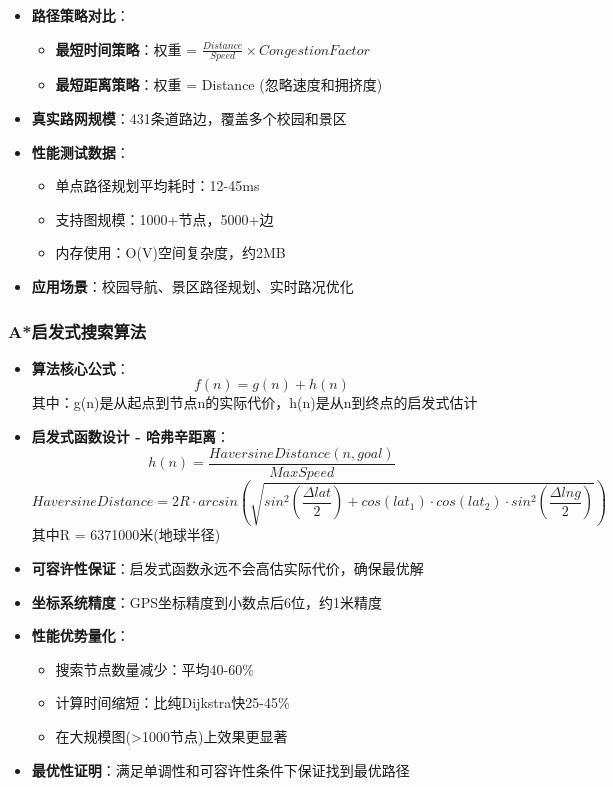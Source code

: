 \documentclass[12pt,a4paper]{article}
\begin{document}
\begin{itemize}
    \item \textbf{路径策略对比}：
    \begin{itemize}
        \item \textbf{最短时间策略}：权重 = \(\frac{Distance}{Speed} \times CongestionFactor\)
        \item \textbf{最短距离策略}：权重 = Distance (忽略速度和拥挤度)
    \end{itemize}
    \item \textbf{真实路网规模}：431条道路边，覆盖多个校园和景区
    \item \textbf{性能测试数据}：
    \begin{itemize}
        \item 单点路径规划平均耗时：12-45ms
        \item 支持图规模：1000+节点，5000+边
        \item 内存使用：O(V)空间复杂度，约2MB
    \end{itemize}
    \item \textbf{应用场景}：校园导航、景区路径规划、实时路况优化
\end{itemize}

\subsubsection{A*启发式搜索算法}
\begin{itemize}
    \item \textbf{算法核心公式}：
    \[f(n) = g(n) + h(n)\]
    其中：g(n)是从起点到节点n的实际代价，h(n)是从n到终点的启发式估计
    \item \textbf{启发式函数设计 - 哈弗辛距离}：
    \[h(n) = \frac{HaversineDistance(n, goal)}{MaxSpeed}\]
    \[HaversineDistance = 2R \cdot arcsin\left(\sqrt{sin^2\left(\frac{\Delta lat}{2}\right) + cos(lat_1) \cdot cos(lat_2) \cdot sin^2\left(\frac{\Delta lng}{2}\right)}\right)\]
    其中R = 6371000米(地球半径)
    \item \textbf{可容许性保证}：启发式函数永远不会高估实际代价，确保最优解
    \item \textbf{坐标系统精度}：GPS坐标精度到小数点后6位，约1米精度
    \item \textbf{性能优势量化}：
    \begin{itemize}
        \item 搜索节点数量减少：平均40-60\%
        \item 计算时间缩短：比纯Dijkstra快25-45\%
        \item 在大规模图(>1000节点)上效果更显著
    \end{itemize}
    \item \textbf{最优性证明}：满足单调性和可容许性条件下保证找到最优路径
\end{itemize}
\end{document}

